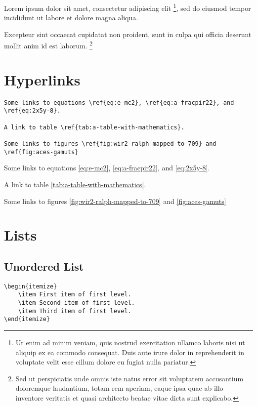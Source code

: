 Lorem ipsum dolor sit amet, consectetur adipiscing elit \footnote{Ut enim ad
minim veniam, quis nostrud exercitation ullamco laboris nisi ut aliquip ex ea
commodo consequat. Duis aute irure dolor in reprehenderit in voluptate velit
esse cillum dolore eu fugiat nulla pariatur.}, sed do eiusmod tempor incididunt
ut labore et dolore magna aliqua.

\begin{center}
Excepteur sint occaecat cupidatat non proident, sunt in culpa qui officia
deserunt mollit anim id est laborum. \footnote{Sed ut perspiciatis unde omnis
iste natus error sit voluptatem accusantium doloremque laudantium, totam rem
aperiam, eaque ipsa quae ab illo inventore veritatis et quasi architecto
beatae vitae dicta sunt explicabo.}
\end{center}

\section*{Hyperlinks}

\begin{lstlisting}[caption={Hyperlinks.}]
Some links to equations \ref{eq:e-mc2}, \ref{eq:a-fracpir22}, and \ref{eq:2x5y-8}.

A link to table \ref{tab:a-table-with-mathematics}.

Some links to figures \ref{fig:wir2-ralph-mapped-to-709} and \ref{fig:aces-gamuts}
\end{lstlisting}

Some links to equations \ref{eq:e-mc2}, \ref{eq:a-fracpir22}, and \ref{eq:2x5y-8}.

A link to table \ref{tab:a-table-with-mathematics}.

Some links to figures \ref{fig:wir2-ralph-mapped-to-709} and \ref{fig:aces-gamuts}

\section*{Lists}

\subsection*{Unordered List}

\begin{lstlisting}[caption={An unordered list.}]
\begin{itemize}
    \item First item of first level.
    \item Second item of first level.
    \item Third item of first level.
\end{itemize}
\end{lstlisting}

